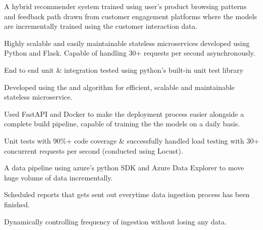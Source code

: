 \vspace{\topsep}


\textbullet{}  \textbullet{}  \textbullet{}  \textbullet{}  

\begin{tightemize}
\item A hybrid recommender system trained using user's product browsing patterns and feedback path drawn from customer engagement platforms where the models are incrementally trained using the customer interaction data.
\item Highly scalable and easily maintainable stateless microservices developed using Python and Flask. Capable of handling 30+ requests per second asynchronously.
\item End to end unit \& integration tested using python's built-in unit test library
\end{tightemize}


 \textbullet{}  \textbullet{}  \textbullet{}  \textbullet{} 

\begin{tightemize}
\item Developed using the  and  algorithm for efficient, scalable and maintainable stateless microservice.
\item Used FastAPI and Docker to make the deployment process easier alongside a complete build pipeline, capable of training the the models on a daily basis.
\item Unit tests with 90\%+ code coverage \& successfully handled load testing with 30+ concurrent requests per second (conducted using Locust).
\end{tightemize}


 \textbullet{}  \textbullet{} 

\begin{tightemize}
\item A data pipeline using azure's python SDK and Azure Data Explorer to move huge volume of data incrementally.
\item Scheduled reports that gets sent out everytime data ingestion process has been finished.
\item Dynamically controlling frequency of ingestion without losing any data.
\end{tightemize}